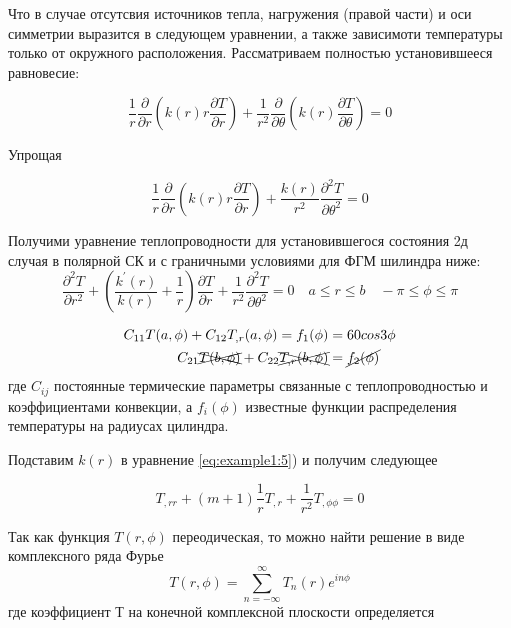 Что в случае отсутсвия источников тепла, нагружения (правой части) и оси симметрии выразится в следующем уравнении, а также зависимоти температуры только от окружного расположения. Рассматриваем полностью установившееся равновесие:

\begin{equation}
	\label{eq:example1:4}
	\frac{1}{r} \frac{\partial}{\partial r} \left (k(r) r \frac{\partial T}{\partial r} \right) + \frac{1}{r^2} \frac{\partial}{\partial \theta} \left (k(r) \frac{\partial T}{\partial \theta} \right ) = 0
\end{equation}

Упрощая

\begin{equation*}
	\frac{1}{r} \frac{\partial}{\partial r} \left (k(r) r \frac{\partial T}{\partial r} \right) + \frac{k(r)}{r^2}  \frac{\partial^2 T}{\partial \theta^2} = 0
\end{equation*}

Получими уравнение теплопроводности для установившегося состояния 2д случая в полярной СК и с граничными условиями для ФГМ шилиндра ниже:
\begin{equation}
	\label{eq:example1:5}
	\frac{\partial^2 T}{\partial r^2} + \left ( \frac{ k^{\prime}(r)}{k(r)} + \frac{1}{r} \right )\frac{\partial T}{\partial r} + \frac{1}{r^2}\frac{\partial^2 T}{\partial \theta^2} = 0 \quad a \le r \le b \quad -\pi \le \phi \le \pi
\end{equation}

\begin{equation}
	\label{eq:example1:6}
	\begin{split}
		C_{11} T(a, \phi) + C_{12} T_{,r}(a, \phi) = f_1 (\phi)& = 60 cos{3 \phi} \\
		C_{21} \xcancel{T(b, \phi)} + C_{22} \xcancel{T_{,r}(b, \phi)} &= \cancel{f_2 (\phi)}
	\end{split}
\end{equation}
где \(C_{ij}\) постоянные термические параметры связанные с теплопроводностью и коэффициентами конвекции, а \(f_i(\phi)\) известные функции распределения температуры на радиусах цилиндра.

Подставим \(k(r)\) в уравнение \cref{eq:example1:5}) и получим следующее


\begin{equation}
	\label{eq:example1:7}
	T_{,rr} + (m+1)\frac{1}{r}T_{,r}+\frac{1}{r^2}T_{,\phi \phi} =0
\end{equation}

Так как функция \(T(r, \phi)\) переодическая, то можно найти решение в виде комплексного ряда Фурье
\begin{equation}
	\label{eq:example1:8}
	T(r, \phi) = \sum_{n=-\infty}^{\infty} T_{n}(r) e^{in\phi}
\end{equation}
где коэффициент Т на конечной комплексной плоскости определяется

